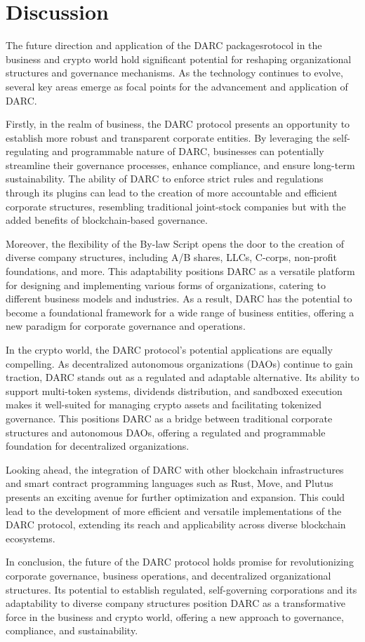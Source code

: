 \documentclass[main.tex]{subfiles}
\begin{document}
\section{Discussion}

The future direction and application of the DARC packagesrotocol in the business and crypto world hold significant potential for reshaping organizational structures and governance mechanisms. As the technology continues to evolve, several key areas emerge as focal points for the advancement and application of DARC.

Firstly, in the realm of business, the DARC protocol presents an opportunity to establish more robust and transparent corporate entities. By leveraging the self-regulating and programmable nature of DARC, businesses can potentially streamline their governance processes, enhance compliance, and ensure long-term sustainability. The ability of DARC to enforce strict rules and regulations through its plugins can lead to the creation of more accountable and efficient corporate structures, resembling traditional joint-stock companies but with the added benefits of blockchain-based governance.

Moreover, the flexibility of the By-law Script opens the door to the creation of diverse company structures, including A/B shares, LLCs, C-corps, non-profit foundations, and more. This adaptability positions DARC as a versatile platform for designing and implementing various forms of organizations, catering to different business models and industries. As a result, DARC has the potential to become a foundational framework for a wide range of business entities, offering a new paradigm for corporate governance and operations.

In the crypto world, the DARC protocol's potential applications are equally compelling. As decentralized autonomous organizations (DAOs) continue to gain traction, DARC stands out as a regulated and adaptable alternative. Its ability to support multi-token systems, dividends distribution, and sandboxed execution makes it well-suited for managing crypto assets and facilitating tokenized governance. This positions DARC as a bridge between traditional corporate structures and autonomous DAOs, offering a regulated and programmable foundation for decentralized organizations.

Looking ahead, the integration of DARC with other blockchain infrastructures and smart contract programming languages such as Rust, Move, and Plutus presents an exciting avenue for further optimization and expansion. This could lead to the development of more efficient and versatile implementations of the DARC protocol, extending its reach and applicability across diverse blockchain ecosystems.

In conclusion, the future of the DARC protocol holds promise for revolutionizing corporate governance, business operations, and decentralized organizational structures. Its potential to establish regulated, self-governing corporations and its adaptability to diverse company structures position DARC as a transformative force in the business and crypto world, offering a new approach to governance, compliance, and sustainability.
\end{document}
